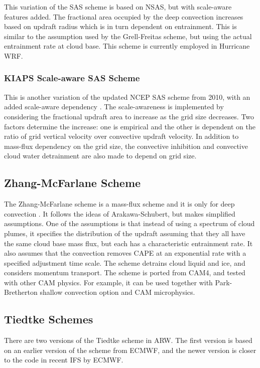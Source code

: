 This variation of the SAS scheme is based on NSAS, but with scale-aware features added. 
The fractional area occupied by the deep convection increases based on updraft radius 
which is in turn dependent on entrainment. This is similar to the assumption used by 
the Grell-Freitas scheme, but using the actual entrainment rate at cloud base. This scheme 
is currently employed in Hurricane WRF.

\subsubsection{KIAPS Scale-aware SAS Scheme}

This is another variation of the updated NCEP SAS scheme from 2010, 
with an added scale-aware dependency \citep{kwon17}. The scale-awareness is implemented by considering 
the fractional updraft area to increase as the grid size decreases. Two factors determine 
the increase: one is empirical and the other is dependent on the ratio of grid vertical 
velocity over convective updraft velocity. In addition to mass-flux dependency on the grid size, 
the convective inhibition and convective cloud water detrainment are also made to depend on grid size.

\subsection{Zhang-McFarlane Scheme}

The Zhang-McFarlane scheme is a mass-flux scheme and it is only for deep convection \citep{zhang95}. 
It follows the ideas of Arakawa-Schubert, but makes simplified 
assumptions. One of the assumptions is that instead of using a spectrum of cloud plumes, 
it specifies the distribution of the updraft assuming that they all have the same cloud 
base mass flux, but each has a characteristic entrainment rate. It also assumes that the 
convection removes CAPE at an exponential rate with a specified adjustment time scale. 
The scheme detrains cloud liquid and ice, and considers momentum transport. The scheme 
is ported from CAM4, and tested with other CAM physics. For example, it can be 
used together with Park-Bretherton shallow convection option and CAM microphysics.

\subsection{Tiedtke Schemes}

There are two versions of the Tiedtke scheme \citep{tiedtke89} in ARW. The first version is based on an earlier version 
of the scheme from ECMWF, and the newer version is closer to the code in recent IFS by ECMWF.

